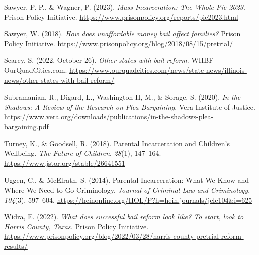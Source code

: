 \documentclass[
  letterpaper,
  DIV=11,
  numbers=noendperiod]{scrartcl}
\newlength{\cslhangindent}
\newlength{\cslentryspacingunit} %
\newenvironment{CSLReferences}[2] %
 {%
  \setlength{\parindent}{0pt}
  \ifodd #1
  \let\oldpar\par
  \def\par{\hangindent=\cslhangindent\oldpar}
  \fi
  \setlength{\parskip}{#2\cslentryspacingunit}
 }%
 {}
\begin{document}
\begin{CSLReferences}{1}{0}
\leavevmode{}%
Sawyer, P. P., \& Wagner, P. (2023). \emph{Mass {Incarceration}: {The
Whole Pie} 2023}. {Prison Policy Initiative}.
\url{https://www.prisonpolicy.org/reports/pie2023.html}

\leavevmode{}%
Sawyer, W. (2018). \emph{How does unaffordable money bail affect
families?} {Prison Policy Initiative}.
\url{https://www.prisonpolicy.org/blog/2018/08/15/pretrial/}

\leavevmode{}%
Searcy, S. (2022, October 26). \emph{Other states with bail reform}.
{WHBF - OurQuadCities.com}.
\url{https://www.ourquadcities.com/news/state-news/illinois-news/other-states-with-bail-reform/}

\leavevmode{}%
Subramanian, R., Digard, L., Washington II, M., \& Sorage, S. (2020).
\emph{In the {Shadows}: {A Review} of the {Research} on {Plea
Bargaining}}. {Vera Institute of Justice}.
\url{https://www.vera.org/downloads/publications/in-the-shadows-plea-bargaining.pdf}

\leavevmode{}%
Turney, K., \& Goodsell, R. (2018). Parental {Incarceration} and
{Children}'s {Wellbeing}. \emph{The Future of Children}, \emph{28}(1),
147--164. \url{https://www.jstor.org/stable/26641551}

\leavevmode{}%
Uggen, C., \& McElrath, S. (2014). Parental {Incarceration}: {What We
Know} and {Where We Need} to {Go Criminology}. \emph{Journal of Criminal
Law and Criminology}, \emph{104}(3), 597--604.
\url{https://heinonline.org/HOL/P?h=hein.journals/jclc104\&i=625}

\leavevmode{}%
Widra, E. (2022). \emph{What does successful bail reform look like? {To}
start, look to {Harris County}, {Texas}.} {Prison Policy Initiative}.
\url{https://www.prisonpolicy.org/blog/2022/03/28/harris-county-pretrial-reform-results/}

\end{CSLReferences}
\end{document}
